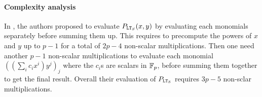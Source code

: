 
\paragraph{Complexity analysis}
In \cite{TLWRK20}, the authors proposed to evaluate $P_{\mathtt{LT}_S}(x,y)$ by evaluating each monomials separately before summing them up. This requires to precompute the powers of $x$ and $y$ up to $p-1$ for a total of $2p-4$ non-scalar multiplications. Then one need another $p-1$ non-scalar multiplications to evaluate each monomial $((\sum_i c_i x^i)y^j)_{j}$ where the $c_i$s are scalars in $\mathbb{F}_p$, before summing them together to get the final result. Overall their evaluation of $P_{\mathtt{LT}_{\mathcal{S}}}$ requires $3p-5$ non-sclar multiplications. \newline

